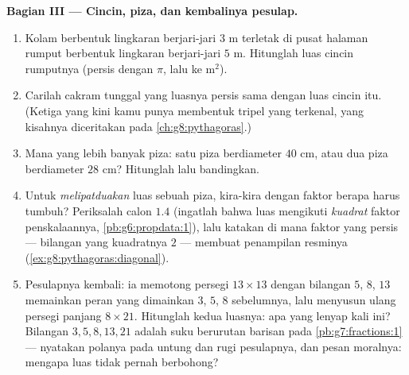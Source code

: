 \begin{problem}[{Soal akhir pekan --- ``bukti'' terkenal bahwa
$64 = 65$, yang dibongkar oleh luas dan kemiringan, dengan piza dan
cincin sebagai pencuci mulut}]
\medskip
\noindent\textbf{Bagian III --- Cincin, piza, dan kembalinya
pesulap.}
\begin{enumerate}[resume]
  \item Kolam berbentuk lingkaran berjari-jari $3$ m terletak di
        pusat halaman rumput berbentuk lingkaran berjari-jari
        $5$ m. Hitunglah luas cincin rumputnya (persis dengan
        $\pi$, lalu  ke m$^2$).
  \item Carilah  cakram tunggal yang luasnya persis sama
        dengan luas cincin itu. (Ketiga  yang kini kamu
        punya membentuk tripel yang terkenal, yang kisahnya
        diceritakan pada \cref{ch:g8:pythagoras}.)
  \item Mana yang lebih banyak piza: satu piza berdiameter
        $40$ cm, atau dua piza berdiameter $28$ cm? Hitunglah lalu
        bandingkan.
  \item Untuk \emph{melipatduakan} luas sebuah piza, kira-kira
        dengan faktor berapa  harus tumbuh? Periksalah
        calon $1.4$ (ingatlah bahwa luas mengikuti \emph{kuadrat}
        faktor penskalaannya, \cref{pb:g6:propdata:1}), lalu
        katakan di mana faktor yang persis --- bilangan yang
        kuadratnya $2$ --- membuat penampilan resminya
        (\cref{ex:g8:pythagoras:diagonal}).
  \item Pesulapnya kembali: ia memotong persegi $13 \times 13$
        dengan bilangan $5$, $8$, $13$ memainkan peran yang
        dimainkan $3$, $5$, $8$ sebelumnya, lalu menyusun ulang
        persegi panjang $8 \times 21$. Hitunglah kedua luasnya:
        apa yang lenyap kali ini? Bilangan $3, 5, 8, 13, 21$
        adalah suku berurutan barisan pada
        \cref{pb:g7:fractions:1} --- nyatakan polanya pada
        untung dan rugi pesulapnya, dan pesan moralnya: mengapa
        luas tidak pernah berbohong?

\end{enumerate}
\end{problem}

